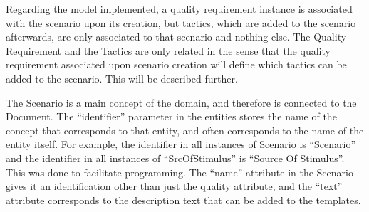 Regarding the model implemented, a quality requirement instance is associated with the scenario upon its creation, but tactics, which are added to the scenario afterwards, are only associated to that scenario and nothing else. The Quality Requirement and the Tactics are only related in the sense that the quality requirement associated upon scenario creation will define which tactics can be added to the scenario. This will be described further.

The Scenario is a main concept of the domain, and therefore is connected to the Document. The ``identifier'' parameter in the entities stores the name of the concept that corresponds to that entity, and often corresponds to the name of the entity itself. For example, the identifier in all instances of Scenario is ``Scenario'' and the identifier in all instances of ``SrcOfStimulus'' is ``Source Of Stimulus''. This was done to facilitate programming. The ``name'' attribute in the Scenario gives it an identification other than just the quality attribute, and the ``text'' attribute corresponds to the description text that can be added to the templates.

